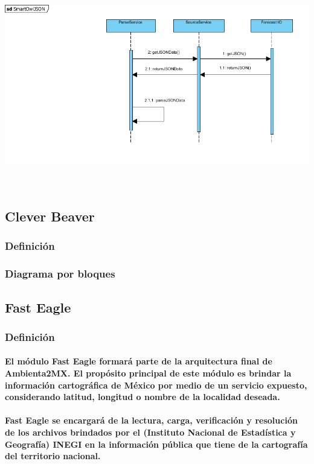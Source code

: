     \begin{center}
      \includegraphics[width=14cm,height=9cm]{./images/SmartOwlSequenceDiagram2}
    \end{center}

  \subsection{Clever Beaver}
    \subsubsection{Definición}
    \subsubsection{Diagrama por bloques}
  \subsection{Fast Eagle}
    \subsubsection{Definición}
      \paragraph{El módulo Fast Eagle formará parte de la arquitectura final de Ambienta2MX. El propósito principal de este módulo es brindar la información cartográfica de México por medio de un servicio expuesto, considerando latitud, longitud o nombre de la localidad deseada.}
      \paragraph{Fast Eagle se encargará de la lectura, carga, verificación y resolución de los archivos brindados por el (Instituto Nacional de Estadística y Geografía) INEGI en la información pública que tiene de la cartografía del territorio nacional.}
